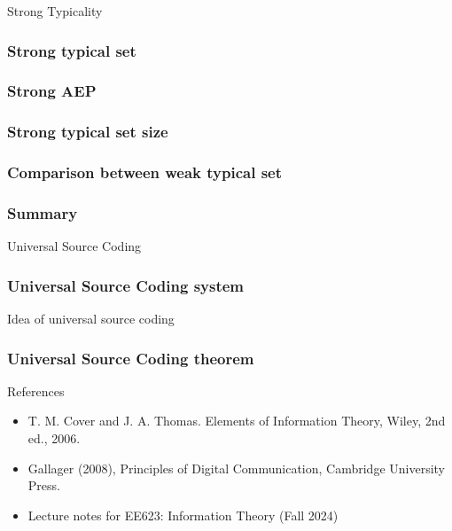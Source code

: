 \documentclass[9pt]{beamer}
\begin{document}
    \begin{section}{Strong Typicality}
        \begin{frame}
            \frametitle{Strong typical set}
            
        \end{frame}

        \begin{frame}
            \frametitle{Strong AEP}
            
        \end{frame}

        \begin{frame}
            \frametitle{Strong typical set size}
            
        \end{frame}

        \begin{frame}
            \frametitle{Comparison between weak typical set}
            
        \end{frame}

        \begin{frame}
            \frametitle{Summary}
            
        \end{frame}
    \end{section}




    \begin{section}{Universal Source Coding}
        \begin{frame}
            \frametitle{Universal Source Coding system}
            
            \begin{block}{Idea of universal source coding}
                
            \end{block}
        \end{frame}
        
        \begin{frame}
            \frametitle{Universal Source Coding theorem}
            
        \end{frame}


    \end{section}

    \begin{frame}{References}
        \begin{itemize}
            \item T. M. Cover and J. A. Thomas. Elements of Information Theory, Wiley, 2nd ed., 2006.
            \item Gallager (2008), Principles of Digital Communication, Cambridge University Press.
            \item Lecture notes for EE623: Information Theory (Fall 2024)
        \end{itemize}
        \vspace{6cm}
    \end{frame}
\end{document}
